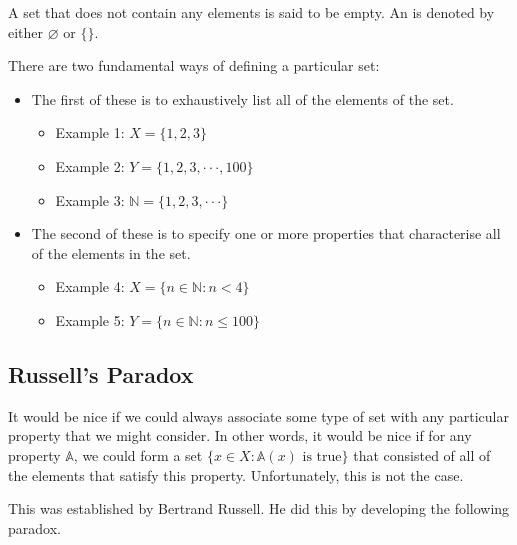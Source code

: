 \documentclass[letterpaper,10pt,english]{jupyterBook}
\begin{document}
\sphinxAtStartPar
A set that does not contain any elements is said to be empty. An  is denoted by either \(\varnothing\) or \(\{\}\).

\sphinxAtStartPar
There are two fundamental ways of defining a particular set:
\begin{itemize}
\item {} 
\sphinxAtStartPar
The first of these is to exhaustively list all of the elements of the set.
\begin{itemize}
\item {} 
\sphinxAtStartPar
Example 1: \(X = \{1, 2, 3\}\)

\item {} 
\sphinxAtStartPar
Example 2: \(Y = \{1, 2, 3, · · · , 100\}\)

\item {} 
\sphinxAtStartPar
Example 3: \(\mathbb{N} = \{1, 2, 3, · · · \}\)

\end{itemize}

\item {} 
\sphinxAtStartPar
The second of these is to specify one or more properties that characterise all of the elements in the set.
\begin{itemize}
\item {} 
\sphinxAtStartPar
Example 4: \(X = \{n \in \mathbb{N} : n < 4\}\)

\item {} 
\sphinxAtStartPar
Example 5: \(Y = \{n \in \mathbb{N} : n \leqslant 100\}\)

\end{itemize}

\end{itemize}


\subsection{Russell’s Paradox}
\label{\detokenize{02.sets_numbers_coordinates_distances:russell-s-paradox}}
\sphinxAtStartPar
It would be nice if we could always associate some type of set with any particular property that we might consider. In other words, it would be nice if for any property \(\mathbb{A}\), we could form a set \(\{x \in X : \mathbb{A}(x) \text{ is true}\}\) that consisted of all of the elements that satisfy this property. Unfortunately, this is not the case.

\sphinxAtStartPar
This was established by Bertrand Russell. He did this by developing the following paradox.
\end{document}
